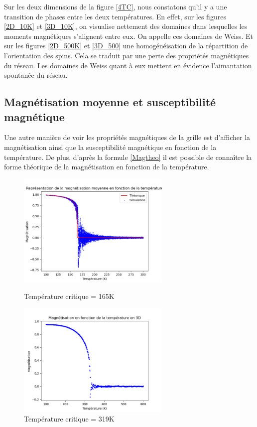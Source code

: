 \documentclass{article}
\begin{document}
Sur les deux dimensions de la figure \ref{4TC}, nous constatons qu'il y a une transition de phases entre les deux températures. En effet, sur les figures \ref{2D_10K} et \ref{3D_10K}, on visualise nettement des domaines  dans lesquelles les moments magnétiques s'alignent entre eux. On appelle ces domaines de Weiss. Et sur les figures \ref{2D_500K} et \ref{3D_500} une homogénéisation de la répartition de l'orientation des spins. Cela se traduit par une perte des propriétés magnétiques du réseau. Les domaines de Weiss quant à eux mettent en évidence l'aimantation spontanée du réseau.

\subsection{Magnétisation moyenne et susceptibilité magnétique}

Une autre manière de voir les propriétés magnétiques de la grille est d'afficher la magnétisation ainsi que la susceptibilité magnétique en fonction de la température. De plus, d'après la formule \ref{Magtheo} il est possible de connaître la forme théorique de la magnétisation en fonction de la température. 

\begin{figure}[ht]
  \centering
  \begin{minipage}[b]{0.45\textwidth}
    \includegraphics[height=5.5cm]{Mag/MagnÃ©tisation en fonction de T.png}
    \caption{Température critique = 165K}
    \label{Mag_2D}
  \end{minipage}
  \hspace{0.5cm}
  \begin{minipage}[b]{0.45\textwidth}
    \includegraphics[height=5.5cm]{Mag/Mag_en_3D.png}
    \caption{Température critique = 319K}
    \label{Mag_3D}
  \end{minipage}
\end{figure}
\end{document}
